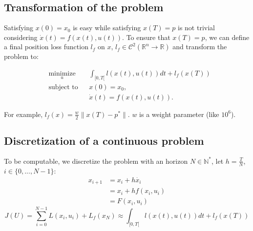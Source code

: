 \documentclass{report}
\begin{document}
%

\subsection{Transformation of the problem}

Satisfying $x(0) = x_0$ is easy while satisfying $x(T) = p$ is not trivial considering $\dot{x} (t) = f(x(t), u(t))$. To ensure that $x(T)= p$, we can define a final position loss function $l_f$ on $x$, $l_f \in \mathscr{C}^2(\mathbb{R}^n \to \mathbb{R})$ and transform the problem to: 

\begin{equation}
\begin{aligned}
& \underset{u}{\text{minimize}}
& & \int_{[0,T[} l(x(t),u(t)) dt + l_f(x(T)) \\
& \text{subject to}
& & x(0) = x_0,  \\
&&& \dot{x} (t) = f(x(t), u(t)).
\end{aligned}
\end{equation}
     
     For example, $l_f(x) = \frac{w}{2} \|x(T) - p^*\|$. $w$ is a weight parameter (like $10^6$).
     
     
\subsection{Discretization of a continuous problem}
To be computable, we discretize the problem with an horizon $N \in \mathbb{N}^*$, let $h=\frac{T}{N}$, $i\in \{0, ..., N-1\}$:
\begin{align*}
    x_{i+1} &= x_i + h \dot{x_i}  \\
            &= x_i + h f(x_i, u_i)  \\
            &= F(x_i, u_i)
\end{align*}
\begin{equation}
J(U) = \sum_{i = 0}^{N-1} L(x_i, u_i) + L_f(x_N) \approx \int_{[0,T[} l(x(t),u(t)) dt + l_f(x(T))
\end{equation}
\end{document}
